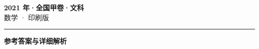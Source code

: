 \documentclass[zihao=5, a4paper]{ctexart}
\begin{document}
\begin{center}
  {\Large\bfseries 2021 年·全国甲卷·文科}\\[4pt]
  {\large 数学 · 印刷版}
\end{center}
\medskip
{}

\par\bigskip\hrule\bigskip
{}
\begin{center}{\large\bfseries 参考答案与详细解析}\end{center}
\smallskip

\end{document}
